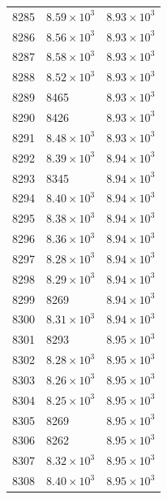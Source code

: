 \begin{table}[H]
\begin{tabular}{lll}
8285 & $\displaystyle 8.59 \times 10^{3}$ & $\displaystyle 8.93 \times 10^{3}$ \\
8286 & $\displaystyle 8.56 \times 10^{3}$ & $\displaystyle 8.93 \times 10^{3}$ \\
8287 & $\displaystyle 8.58 \times 10^{3}$ & $\displaystyle 8.93 \times 10^{3}$ \\
8288 & $\displaystyle 8.52 \times 10^{3}$ & $\displaystyle 8.93 \times 10^{3}$ \\
8289 & 8465 & $\displaystyle 8.93 \times 10^{3}$ \\
8290 & 8426 & $\displaystyle 8.93 \times 10^{3}$ \\
8291 & $\displaystyle 8.48 \times 10^{3}$ & $\displaystyle 8.93 \times 10^{3}$ \\
8292 & $\displaystyle 8.39 \times 10^{3}$ & $\displaystyle 8.94 \times 10^{3}$ \\
8293 & 8345 & $\displaystyle 8.94 \times 10^{3}$ \\
8294 & $\displaystyle 8.40 \times 10^{3}$ & $\displaystyle 8.94 \times 10^{3}$ \\
8295 & $\displaystyle 8.38 \times 10^{3}$ & $\displaystyle 8.94 \times 10^{3}$ \\
8296 & $\displaystyle 8.36 \times 10^{3}$ & $\displaystyle 8.94 \times 10^{3}$ \\
8297 & $\displaystyle 8.28 \times 10^{3}$ & $\displaystyle 8.94 \times 10^{3}$ \\
8298 & $\displaystyle 8.29 \times 10^{3}$ & $\displaystyle 8.94 \times 10^{3}$ \\
8299 & 8269 & $\displaystyle 8.94 \times 10^{3}$ \\
8300 & $\displaystyle 8.31 \times 10^{3}$ & $\displaystyle 8.94 \times 10^{3}$ \\
8301 & 8293 & $\displaystyle 8.95 \times 10^{3}$ \\
8302 & $\displaystyle 8.28 \times 10^{3}$ & $\displaystyle 8.95 \times 10^{3}$ \\
8303 & $\displaystyle 8.26 \times 10^{3}$ & $\displaystyle 8.95 \times 10^{3}$ \\
8304 & $\displaystyle 8.25 \times 10^{3}$ & $\displaystyle 8.95 \times 10^{3}$ \\
8305 & 8269 & $\displaystyle 8.95 \times 10^{3}$ \\
8306 & 8262 & $\displaystyle 8.95 \times 10^{3}$ \\
8307 & $\displaystyle 8.32 \times 10^{3}$ & $\displaystyle 8.95 \times 10^{3}$ \\
8308 & $\displaystyle 8.40 \times 10^{3}$ & $\displaystyle 8.95 \times 10^{3}$ \\

\end{tabular}
\end{table}
